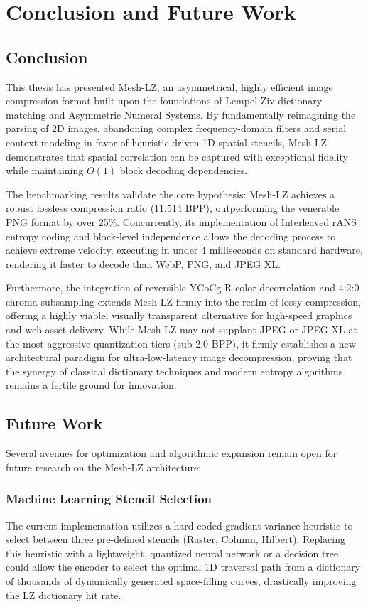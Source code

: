 \chapter{Conclusion and Future Work}
\label{ch:conclusion}

\section{Conclusion}

This thesis has presented Mesh-LZ, an asymmetrical, highly efficient image compression format built upon the foundations of Lempel-Ziv dictionary matching and Asymmetric Numeral Systems. By fundamentally reimagining the parsing of 2D images, abandoning complex frequency-domain filters and serial context modeling in favor of heuristic-driven 1D spatial stencils, Mesh-LZ demonstrates that spatial correlation can be captured with exceptional fidelity while maintaining $O(1)$ block decoding dependencies.

The benchmarking results validate the core hypothesis: Mesh-LZ achieves a robust lossless compression ratio (11.514 BPP), outperforming the venerable PNG format by over 25\%. Concurrently, its implementation of Interleaved rANS entropy coding and block-level independence allows the decoding process to achieve extreme velocity, executing in under 4 milliseconds on standard hardware, rendering it faster to decode than WebP, PNG, and JPEG XL.

Furthermore, the integration of reversible YCoCg-R color decorrelation and 4:2:0 chroma subsampling extends Mesh-LZ firmly into the realm of lossy compression, offering a highly viable, visually transparent alternative for high-speed graphics and web asset delivery. While Mesh-LZ may not supplant JPEG or JPEG XL at the most aggressive quantization tiers (sub 2.0 BPP), it firmly establishes a new architectural paradigm for ultra-low-latency image decompression, proving that the synergy of classical dictionary techniques and modern entropy algorithms remains a fertile ground for innovation.

\section{Future Work}

Several avenues for optimization and algorithmic expansion remain open for future research on the Mesh-LZ architecture:

\subsection{Machine Learning Stencil Selection}
The current implementation utilizes a hard-coded gradient variance heuristic to select between three pre-defined stencils (Raster, Column, Hilbert). Replacing this heuristic with a lightweight, quantized neural network or a decision tree could allow the encoder to select the optimal 1D traversal path from a dictionary of thousands of dynamically generated space-filling curves, drastically improving the LZ dictionary hit rate.

